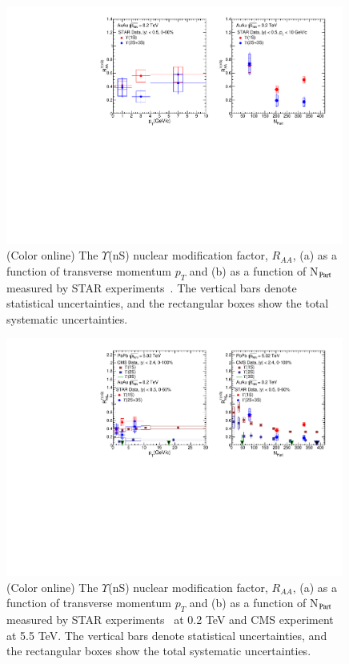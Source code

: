 \begin{figure}
  \includegraphics[width=0.99\textwidth]{Figures/ExpOverview/Fig_RHIC_YnSRAAPt.pdf}
  \caption{(Color online) The $\Upsilon$(nS) nuclear modification factor, $R_{AA}$, (a) as a function of transverse momentum $p_{T}$
    and (b) as a function of N$_{\rm Part}$ measured by STAR experiments~\cite{Wang:2019vau}. The vertical bars denote
    statistical uncertainties, and the rectangular boxes show the total systematic uncertainties.
  }
  \label{fig:RHICYnSRAAPt}
\end{figure}



\begin{figure}
  \includegraphics[width=0.99\textwidth]{Figures/ExpOverview/Fig_RHIC_LHC_YnSRAA.pdf}
  \caption{(Color online) The $\Upsilon$(nS) nuclear modification factor, $R_{AA}$, (a) as a function of transverse momentum $p_{T}$
    and (b) as a function of N$_{\rm Part}$ measured by STAR experiments~\cite{Wang:2019vau} at 0.2 TeV and CMS experiment~\cite{CMS:2018zza} at 5.5 TeV.
    The vertical bars denote statistical uncertainties, and the rectangular boxes show the total systematic uncertainties.
  }
  \label{fig:RHICYnSRAANPart}
\end{figure}


